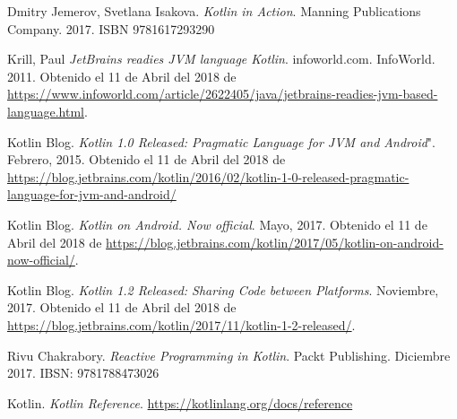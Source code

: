 
\begin{thebibliography}{9}

 Dmitry Jemerov, Svetlana Isakova. \emph{Kotlin in Action}. Manning Publications Company. 2017. ISBN 9781617293290

 Krill, Paul \emph{JetBrains readies JVM language Kotlin}. infoworld.com. InfoWorld. 2011. Obtenido el 11 de Abril del 2018 de \url{https://www.infoworld.com/article/2622405/java/jetbrains-readies-jvm-based-language.html}.

 Kotlin Blog. \emph{Kotlin 1.0 Released: Pragmatic Language for JVM and Android}". Febrero, 2015. Obtenido el 11 de Abril del 2018 de \url{https://blog.jetbrains.com/kotlin/2016/02/kotlin-1-0-released-pragmatic-language-for-jvm-and-android/}

 Kotlin Blog. \emph{Kotlin on Android. Now official}. Mayo, 2017. Obtenido el 11 de Abril del 2018 de \url{https://blog.jetbrains.com/kotlin/2017/05/kotlin-on-android-now-official/}.

 Kotlin Blog. \emph{Kotlin 1.2 Released: Sharing Code between Platforms}. Noviembre, 2017. Obtenido el 11 de Abril del 2018 de \url{https://blog.jetbrains.com/kotlin/2017/11/kotlin-1-2-released/}.

 Rivu Chakrabory. \emph{Reactive Programming in Kotlin}. Packt Publishing. Diciembre 2017. IBSN: 9781788473026

 Kotlin. \emph{Kotlin Reference}. \url{https://kotlinlang.org/docs/reference}

\end{thebibliography}



